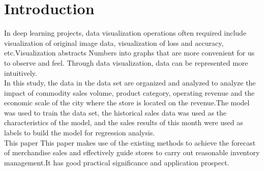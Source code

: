 \section{Introduction}\label{sec-preliminaries}
\label{sec-intro}

In deep learning projects, data visualization operations often required include visualization of original image data, visualization of loss and accuracy, etc.Visualization abstracts Numbers into graphs that are more convenient for us to observe and feel. Through data visualization, data can be represented more intuitively.\\
  \indent In this study, the data in the data set are organized and analyzed to analyze the impact of commodity sales volume, product category, operating revenue and the economic scale of the city where the store is located on the revenue.The model was used to train the data set, the historical sales data was used as the characteristics of the model, and the sales results of this month were used as labels to build the model for regression analysis.\\
  \indent This paper This paper makes use of the existing methods to achieve the forecast of merchandise sales and effectively guide stores to carry out reasonable inventory management.It has good practical significance and application prospect.\\




















